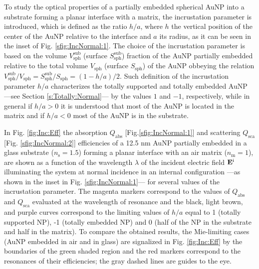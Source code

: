 
To study the optical properties of a partially embedded spherical AuNP into a substrate forming a planar interface with a matrix, the incrustation parameter is introduced, which is defined as the ratio $h/a$, where $h$ the vertical position of the center of the AuNP relative to the interface and $a$ its radius, as it can be seen in the inset of Fig. \ref{sfig:IncNormal:1}. The choice of the incrustation parameter is based on the volume $V_\text{sph}^\text{sub}$ (surface $S_\text{sph}^\text{sub}$) fraction of the
AuNP partially embedded relative to the total volume $V_\text{sph}$ (surface $S_\text{sph}$) of the AuNP   obbeying the relation $V_\text{sph}^\text{sub}/V_\text{sph} = S_\text{sph}^\text{sub}/S_\text{sph} = (1-h/a)/2$. Such definition of the incrustation parameter $h/a$ characterizes the totally supported and totally embedded AuNP  ---see Section \ref{s:Totally:Normal}--- by the values $1$ and $-1$, respectively, while in general  if $h/a>0$ it is understood that most of the AuNP is located in the matrix and if $h/a<0$ most of the AuNP is in the substrate.

In Fig. \ref{fig:Inc:Eff} the absorption $Q_\text{abs}$ [Fig.\ref{sfig:IncNormal:1}] and scattering $Q_\text{sca}$ [Fig. \ref{sfig:IncNormal:2}] efficiencies of a 12.5 nm AuNP partially embedded in a glass substrate ($n_\text{s} = 1.5$) forming a planar interface with an air matrix ($n_\text{m} = 1$), are shown as a function of the wavelength $\lambda$ of the incident electric field $\vb{E}^\text{i}$ illuminating the system at normal incidence in an internal configuration ---as shown in the inset in Fig. \ref{sfig:IncNormal:1}--- for several values of the incrustation parameter. The magenta markers correspond to the values of $Q_\text{abs}$ and $Q_\text{sca}$ evaluated at the wavelength of resonance and the black, light brown, and purple curves correspond to the limiting values of $h/a$ equal to 1 (totally supported NP), -1 (totally embedded NP) and 0 (half of the NP in the substrate and half in the matrix). To compare the obtained results, the Mie-limiting cases (AuNP embedded in air and in glass)  are signalized in Fig. \ref{fig:Inc:Eff} by the boundaries of the green shaded region  and the red markers correspond to the resonances of their efficiencies; the gray dashed lines are guides to the eye.

